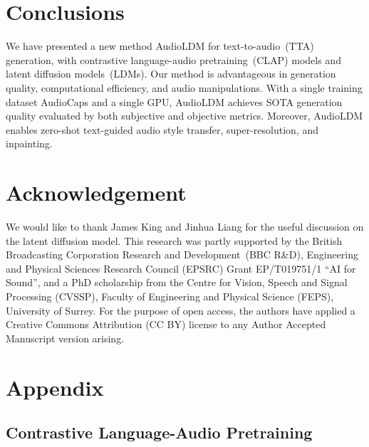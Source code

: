 \documentclass{article}
\begin{document}
\section{Conclusions}
\label{Conclusion}
We have presented a new method AudioLDM for text-to-audio~(TTA) generation, with contrastive language-audio pretraining~(CLAP) models and latent diffusion models~(LDMs). Our method is advantageous in generation quality, computational efficiency, and audio manipulations. With a single training dataset AudioCaps and a single GPU, AudioLDM achieves SOTA generation quality evaluated by both subjective and objective metrics. Moreover, AudioLDM enables zero-shot text-guided audio style transfer, super-resolution, and inpainting.

\section{Acknowledgement}
\label{sec:ack}
We would like to thank James King and Jinhua Liang for the useful discussion on the latent diffusion model. This research was partly supported by the British Broadcasting Corporation Research and Development~(BBC R\&D), Engineering and Physical Sciences Research Council (EPSRC) Grant EP/T019751/1 ``AI for Sound'', and a PhD scholarship from the Centre for Vision, Speech and Signal Processing (CVSSP), Faculty of Engineering and Physical Science (FEPS), University of Surrey. For the purpose of open access, the authors have applied a Creative Commons Attribution (CC BY) license to any Author Accepted Manuscript version arising.




\newpage
\onecolumn
\section*{Appendix}
\label{sec:appendix}



\renewcommand{\thesubsection}{\Alph{subsection}}




\subsection{Contrastive Language-Audio Pretraining}
\label{app:CLAP}
\end{document}
